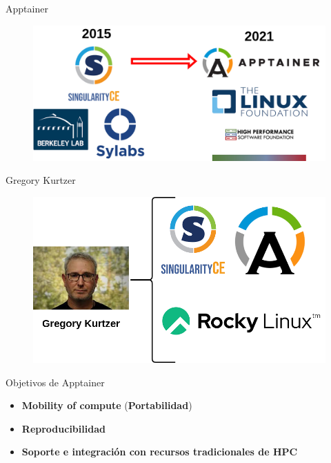 \documentclass[11pt]{beamer}
\begin{document}
\begin{frame}{Apptainer}
  \begin{figure}
  	\includegraphics[scale=0.31]{images/apptainer_historia}
  \end{figure}
\end{frame}


\begin{frame}{Gregory Kurtzer}
  \begin{figure}
  	\includegraphics[scale=0.4]{images/kurtzer}
  \end{figure}
\end{frame}

\begin{frame}{Objetivos de Apptainer \citep{kurtzer2017singularity}}
  \begin{itemize}
  	\item \textbf{Mobility of compute} (\textbf{Portabilidad})
  	\item \textbf{Reproducibilidad}
  	\item \textbf{Soporte e integración con recursos tradicionales de HPC}
  \end{itemize}
\end{frame}
\end{document}
